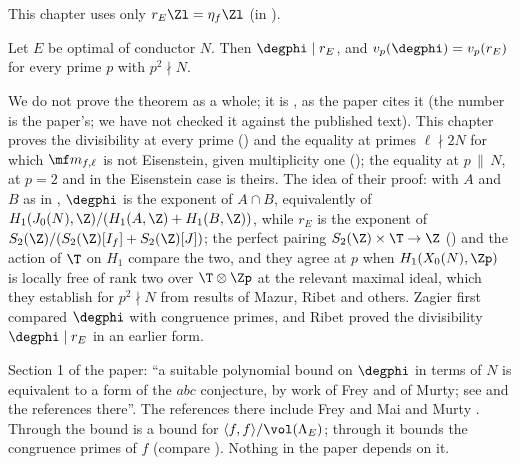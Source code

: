 This chapter uses only $r_E\Zl=\eta_f\Zl$ (in ).

\begin{theorem}\label{thm:moddeg:ars}
Let $E$ be optimal of conductor $N$. Then $\degphi\mid r_E$, and $v_p(\degphi)=v_p(r_E)$ for every prime $p$ with $p^2\nmid N$.
\end{theorem}

We do not prove the theorem as a whole; it is \cite[Theorem 2.2]{ARS12}, as the paper cites it (the number is the paper's; we have not checked it against the published
text). This chapter proves the divisibility at every prime () and the equality at primes $\ell\nmid2N$ for which $\mf m_{f,\ell}$ is not Eisenstein, given
multiplicity one (); the equality at $p\,\|\,N$, at $p=2$ and in the Eisenstein case is theirs. The idea of their proof: with $A$ and $B$ as in
, $\degphi$ is the exponent of $A\cap B$, equivalently of $H_1(J_0(N),\Z)/(H_1(A,\Z)+H_1(B,\Z))$, while $r_E$ is the exponent of
$S_2(\Z)/(S_2(\Z)[I_f]+S_2(\Z)[J])$; the perfect pairing $S_2(\Z)\times\T\to\Z$ () and the action of $\T$ on $H_1$ compare the two, and they agree at $p$ when $H_1(X_0(N),\Zp)$ is
locally free of rank two over $\T\otimes\Zp$ at the relevant maximal ideal, which they establish for $p^2\nmid N$ from results of Mazur, Ribet and others. Zagier \cite{Zagier85} first
compared $\degphi$ with congruence primes, and Ribet \cite{Ribet83} proved the divisibility $\degphi\mid r_E$ in an earlier form.

\begin{remark}\label{rem:moddeg:abc-size}
Section 1 of the paper: ``a suitable polynomial bound on $\degphi$ in terms of $N$ is equivalent to a form of the $abc$ conjecture, by work of Frey and of Murty; see \cite[\S2]{ARS12} and the references there''. The
references there include Frey \cite{Frey} and Mai and Murty \cite{MaiMurty}. Through  the bound is a bound for $\langle f,f\rangle/\vol(\Lambda_E)$; through
 it bounds the congruence primes of $f$ (compare \cite{Murty99}). Nothing in the paper depends on it.
\end{remark}

